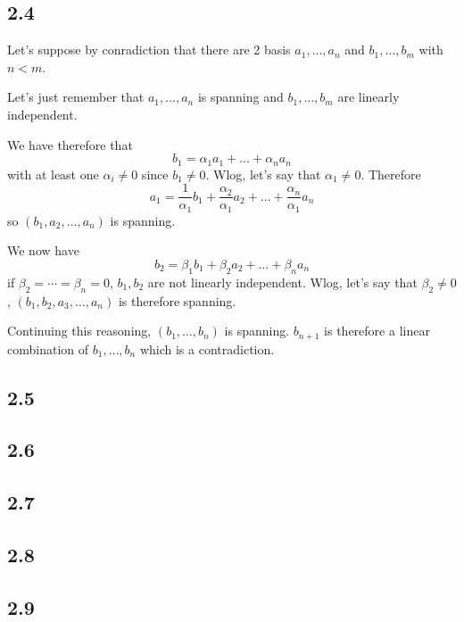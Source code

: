 \subsection*{2.4}
\begin{solution}
  Let's suppose by conradiction that there are 2
  basis $a_1, \ldots, a_n$ and $b_1, \ldots, b_m$ with $n < m$.

  Let's just remember that $a_1, \ldots, a_n$ is spanning
  and $b_1, \ldots, b_m$ are linearly independent.

  We have therefore that
  \[ b_1 = \alpha_1 a_1 + \ldots + \alpha_n a_n\]
  with at least one $\alpha_i \neq 0$ since $b_1 \neq 0$.
  Wlog, let's say that $\alpha_1 \neq 0$.
  Therefore
  \[ a_1 = \frac{1}{\alpha_1}b_1 + \frac{\alpha_2}{\alpha_1} a_2 + \ldots + \frac{\alpha_n}{\alpha_1} a_n\]
  so $(b_1, a_2, \ldots, a_n)$ is spanning.

  We now have
  \[ b_2 = \beta_1 b_1 + \beta_2 a_2 + \ldots + \beta_n a_n\]
  if $\beta_2 = \cdots = \beta_n = 0$, $b_1, b_2$ are not linearly independent.
  Wlog, let's say that $\beta_2 \neq 0$,
  $(b_1,b_2,a_3,\ldots,a_n)$ is therefore spanning.

  Continuing this reasoning, $(b_1,\ldots,b_n)$ is spanning.
  $b_{n+1}$ is therefore a linear combination of $b_1, \ldots, b_n$ which is a contradiction.
\end{solution}

\subsection*{2.5}
\nosolution

\subsection*{2.6}
\nosolution

\subsection*{2.7}
\nosolution

\subsection*{2.8}
\nosolution

\subsection*{2.9}
\nosolution

